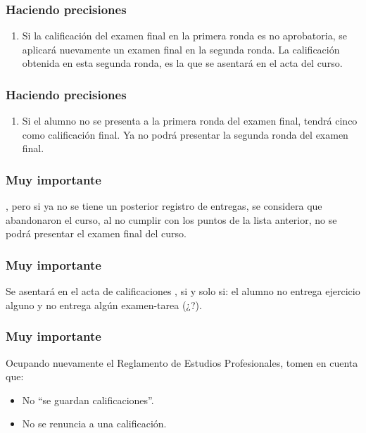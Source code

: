 \documentclass[12pt]{beamer}
\begin{document}
\begin{frame}
\frametitle{Haciendo precisiones}
\begin{enumerate}[<+->]
\conti
\item Si la calificación del examen final en la primera ronda es no aprobatoria, se aplicará nuevamente un examen final en la segunda ronda. La calificación obtenida en esta segunda ronda, es la que se asentará en el acta del curso.
\seti
\end{enumerate}
\end{frame}
\begin{frame}
\frametitle{Haciendo precisiones}
\begin{enumerate}[<+->]
\conti
\item Si el alumno no se presenta a la primera ronda del examen final, tendrá cinco como calificación final. Ya no podrá presentar la segunda ronda del examen final.
\end{enumerate}
\end{frame}
\begin{frame}
\frametitle{Muy importante}
 \pause {}, pero si ya no se tiene un posterior registro de entregas, se considera que abandonaron el curso, al no cumplir con los puntos de la lista anterior, \pause no se podrá presentar el examen final del curso.
\end{frame}
\begin{frame}
\frametitle{Muy importante}
Se asentará en el acta de calificaciones , si y solo si: el alumno no entrega ejercicio alguno y no entrega algún examen-tarea (¿?).
\end{frame}
\begin{frame}
\frametitle{Muy importante}
Ocupando nuevamente el Reglamento de Estudios Profesionales, tomen en cuenta que:
\begin{itemize}[<+->]
\setlength\itemsep{1pt}
\item No \enquote{se guardan calificaciones}.
\item No se renuncia a una calificación.
\end{itemize}
\end{frame}
\end{document}
